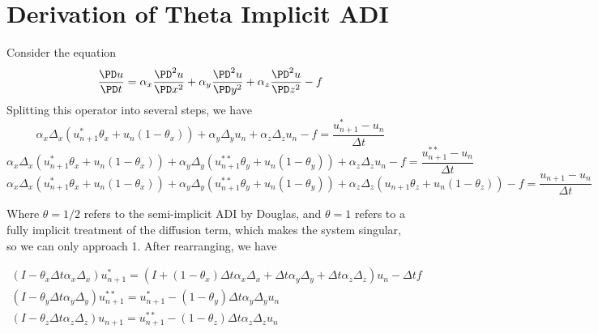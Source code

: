 \documentclass[11pt]{article}
\begin{document}
\doublespacing
\MOONSTITLE
\maketitle

\section{Derivation of Theta Implicit ADI}
Consider the equation
\begin{equation}
	\frac{\PD u}{\PD t}
	=
	\alpha_x \frac{\PD^2 u}{\PD x^2} +
	\alpha_y \frac{\PD^2 u}{\PD y^2} +
	\alpha_z \frac{\PD^2 u}{\PD z^2}
	-
	f
\end{equation}
Splitting this operator into several steps, we have
\begin{equation}
	\alpha_x \Delta_x (u_{n+1}^{*} \theta_x + u_{n} (1- \theta_x)) +
	\alpha_y \Delta_y u_n +
	\alpha_z \Delta_z u_n	-
	f =
	\frac{u_{n+1}^{*} - u_{n}}{\Delta t}
\end{equation}
\begin{equation}
	\alpha_x \Delta_x (u_{n+1}^{*} \theta_x + u_{n} (1- \theta_x)) +
	\alpha_y \Delta_y (u_{n+1}^{**}\theta_y + u_{n} (1- \theta_y)) +
	\alpha_z \Delta_z u_n	-
	f =
	\frac{u_{n+1}^{**} - u_{n}}{\Delta t}
\end{equation}
\begin{equation}
	\alpha_x \Delta_x (u_{n+1}^{*} \theta_x + u_{n} (1- \theta_x)) +
	\alpha_y \Delta_y (u_{n+1}^{**}\theta_y + u_{n} (1- \theta_y)) +
	\alpha_z \Delta_z (u_{n+1}\theta_z + u_{n} (1- \theta_z)) -
	f =
	\frac{u_{n+1} - u_{n}}{\Delta t}
\end{equation}

Where $\theta = 1/2$ refers to the semi-implicit ADI by Douglas, and $\theta = 1$ refers to a fully implicit treatment of the diffusion term, which makes the system singular, so we can only approach 1. After rearranging, we have

\begin{equation}\boxed{\begin{aligned}
	\left(
	I - \theta_x \Delta t \alpha_x \Delta_x
	\right)
	u_{n+1}^{*}
	=
	\left(
	I + (1-\theta_x) \Delta t \alpha_x \Delta_x +
	\Delta t \alpha_y \Delta_y +
	\Delta t \alpha_z \Delta_z
	\right)
	u_n - \Delta t f \\
	\left(
	I - \theta_y \Delta t \alpha_y \Delta_y
	\right)
	u_{n+1}^{**}
	=
	u_{n+1}^{*}
	- (1-\theta_y) \Delta t \alpha_y \Delta_y u_n \\
	\left(
	I - \theta_z \Delta t \alpha_z \Delta_z
	\right)
	u_{n+1}
	=
	u_{n+1}^{**}
	- (1-\theta_z) \Delta t \alpha_z \Delta_z u_n
\end{aligned}}\end{equation}
\end{document}
